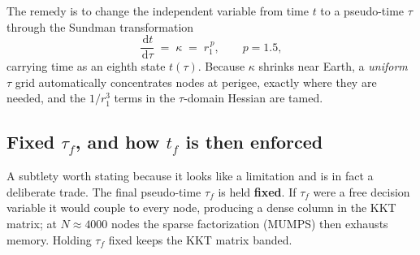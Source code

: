 \documentclass[11pt]{article}
\newcommand{\ud}{\,\mathrm{d}}
\begin{document}
The remedy is to change the independent variable from time $t$ to a
pseudo-time $\tau$ through the Sundman transformation
\begin{equation}
\frac{\ud t}{\ud \tau} \;=\; \kappa \;=\; r_1^{\,p},
\qquad p = 1.5 ,
\end{equation}
carrying time as an eighth state $t(\tau)$. Because $\kappa$ shrinks near
Earth, a \emph{uniform} $\tau$ grid automatically concentrates nodes at
perigee, exactly where they are needed, and the $1/r_1^3$ terms in the
$\tau$-domain Hessian are tamed.

\subsection{Fixed $\tau_f$, and how $t_f$ is then enforced}

A subtlety worth stating because it looks like a limitation and is in fact a
deliberate trade. The final pseudo-time $\tau_f$ is held \textbf{fixed}. If
$\tau_f$ were a free decision variable it would couple to every node, producing
a dense column in the KKT matrix; at $N\approx4000$ nodes the sparse
factorization (MUMPS) then exhausts memory. Holding $\tau_f$ fixed keeps the
KKT matrix banded.
\end{document}
